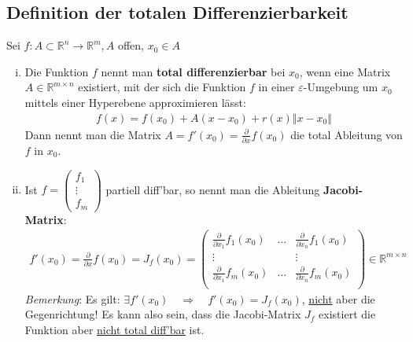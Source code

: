 \documentclass[11pt,a4paper]{book}
\newcommand {\Rn}	{\mathbb{R}^n}
\newcommand {\Rm}	{\mathbb{R}^m}
\newcommand {\Rmxn}	{\mathbb{R}^{m \times n}}
\newcommand{\1}    	{\mathbbm{1}}
\begin{document}
\subsection{Definition der totalen Differenzierbarkeit}
Sei \(f : A \subset \Rn \rightarrow \Rm, A\) offen, \(x_0 \in A\)
\begin{enumerate}[(i)]
	\item Die Funktion \(f\) nennt man \textbf{total differenzierbar} bei \(x_0\), wenn eine Matrix \(A \in \Rmxn\) existiert, mit der sich die Funktion \(f\) in einer \(\varepsilon\)-Umgebung um \(x_0\) mittels einer Hyperebene approximieren lässt:
	\begin{align*}
		f(x) = f(x_0) + A(x-x_0) + r(x)\Vert x - x_0 \Vert
	\end{align*}
	Dann nennt man die Matrix \(A = f'(x_0) = \frac{\partial}{\partial x} f(x_0)\) die total Ableitung von \(f\) in \(x_0\).
	\item Ist \(f = \left( \begin{array}{c} f_1 \\ \vdots \\ f_m \end{array} \right) \) partiell diff'bar, so nennt man die Ableitung \textbf{Jacobi-Matrix}:
	\begin{align*}
		f'(x_0) = \frac{\partial}{\partial x} f(x_0) = J_f(x_0) = \left( \begin{array}{ccc}
			\frac{\partial}{\partial x_1} f_1(x_0) & \hdots & \frac{\partial}{\partial x_n} f_1(x_0) \\
			\vdots & & \vdots \\
			\frac{\partial}{\partial x_1} f_m(x_0) & \hdots & \frac{\partial}{\partial x_n} f_m(x_0) \\
		\end{array} \right) \in \Rmxn
	\end{align*}
	\textit{Bemerkung}: Es gilt: \( \exists f'(x_0) \quad \Rightarrow \quad f'(x_0) = J_f(x_0) \), \underline{nicht} aber die Gegenrichtung! Es kann also sein, dass die Jacobi-Matrix \(J_f\) existiert die Funktion aber \underline{nicht total diff'bar} ist.
\end{enumerate}
\end{document}
